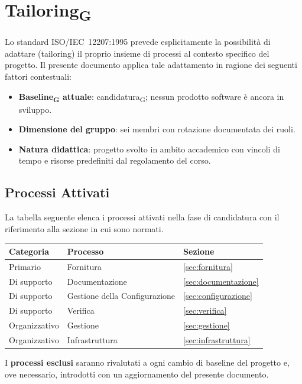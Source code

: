 \section{Tailoring\textsubscript{G}}
\label{sec:tailoring}
 
Lo standard ISO/IEC~12207:1995 prevede esplicitamente la possibilità di adattare
(tailoring) il proprio insieme di processi al contesto specifico
del progetto. Il presente documento applica tale adattamento in ragione dei seguenti
fattori contestuali:
 
\begin{itemize}
  \item \textbf{Baseline\textsubscript{G} attuale}: candidatura\textsubscript{G}; nessun
        prodotto software è ancora in sviluppo.
  \item \textbf{Dimensione del gruppo}: sei membri con rotazione documentata dei
        ruoli.
  \item \textbf{Natura didattica}: progetto svolto in ambito accademico con vincoli
        di tempo e risorse predefiniti dal regolamento del corso.
\end{itemize}
 
\subsection{Processi Attivati}
 
La tabella seguente elenca i processi attivati nella fase di candidatura con il
riferimento alla sezione in cui sono normati.
 
\bigskip
\begin{tabularx}{\textwidth}{l l X}
  \toprule
  \textbf{Categoria} & \textbf{Processo} & \textbf{Sezione} \\
  \midrule
  Primario      & Fornitura                     & \ref{sec:fornitura} \\
  Di supporto   & Documentazione                & \ref{sec:documentazione} \\
  Di supporto   & Gestione della Configurazione & \ref{sec:configurazione} \\
  Di supporto   & Verifica                      & \ref{sec:verifica} \\
  Organizzativo & Gestione                      & \ref{sec:gestione} \\
  Organizzativo & Infrastruttura                & \ref{sec:infrastruttura} \\
  \bottomrule
\end{tabularx}
 
\bigskip
I \textbf{processi esclusi} saranno rivalutati a ogni cambio di baseline del progetto e,
ove necessario, introdotti con un aggiornamento del presente documento.
 